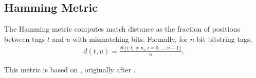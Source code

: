 \subsection{Hamming Metric} \label{sec:hamming}

The Hamming metric computes match distance as the fraction of positions between tags $t$ and $u$ with mismatching bits.
Formally, for $n$-bit bitstring tags,
\begin{align*}
d(t, u)
= \frac{
  \#\{ i : t_i \neq u_i, i=0, \dots ,n-1\}
}{
  n
}.
\end{align*}

This metric is based on \cite{lalejini2019else}, originally after \cite{hamming1950error}.
